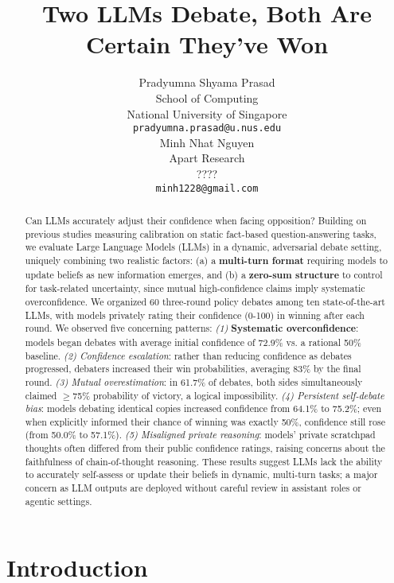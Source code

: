 \documentclass{article}
\title{Two LLMs Debate, Both Are Certain They've Won}
\author{%
Pradyumna Shyama Prasad \\ %
  School of Computing \\ %
  National University of Singapore \\ %
  \texttt{pradyumna.prasad@u.nus.edu} \\ %
  \And
  Minh Nhat Nguyen \\
  Apart Research \\
  ???? \\
  \texttt{minh1228@gmail.com} \\
}
\begin{document}
\maketitle


\begin{abstract}
  Can LLMs accurately adjust their confidence when facing opposition? Building on previous studies measuring calibration on static fact-based question-answering tasks, we evaluate Large Language Models (LLMs) in a dynamic, adversarial debate setting, uniquely combining two realistic factors: (a) a \textbf{multi-turn format} requiring models to update beliefs as new information emerges, and (b) a \textbf{zero-sum structure} to control for task-related uncertainty, since mutual high-confidence claims imply systematic overconfidence. We organized 60 three-round policy debates among ten state-of-the-art LLMs, with models privately rating their confidence (0-100) in winning after each round. We observed five concerning patterns: \textit{(1)} \textbf{Systematic overconfidence}: models began debates with average initial confidence of 72.9\% vs. a rational 50\% baseline. \textit{(2) Confidence escalation}: rather than reducing confidence as debates progressed, debaters increased their win probabilities, averaging 83\% by the final round. \textit{(3) Mutual overestimation}: in 61.7\% of debates, both sides simultaneously claimed $\geq$75\% probability of victory, a logical impossibility. \textit{(4) Persistent self-debate bias}: models debating identical copies increased confidence from 64.1\% to 75.2\%; even when explicitly informed their chance of winning was exactly 50\%, confidence still rose (from 50.0\% to 57.1\%). \textit{(5) Misaligned private reasoning}: models' private scratchpad thoughts often differed from their public confidence ratings, raising concerns about the faithfulness of chain-of-thought reasoning. These results suggest LLMs lack the ability to accurately self-assess or update their beliefs in dynamic, multi-turn tasks; a major concern as LLM outputs are deployed without careful review in assistant roles or agentic settings.
  \end{abstract}


\section{Introduction}
\end{document}
